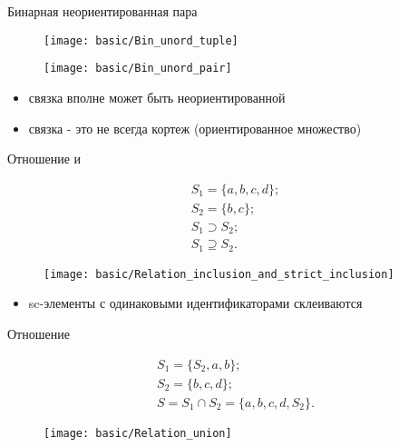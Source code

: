 \begin{frame}{Бинарная неориентированная пара}
  \begin{center}
    \begin{figure}
      \texttt{[image: basic/Bin\_unord\_tuple]}
    \end{figure}

    \objeqv

    \begin{figure}
      \texttt{[image: basic/Bin\_unord\_pair]}
    \end{figure}
  \end{center}

  \begin{itemize}
  \item связка вполне может быть неориентированной
  \item связка - это не всегда кортеж (ориентированное множество)
  \end{itemize}
\end{frame}

\begin{frame}[shrink=10]{Отношение  и }
  \begin{center}
    \begin{eqnarray*}
      S_1 = \{ a, b, c, d \}; \\
      S_2 = \{ b, c \}; \\
      S_1 \supset S_2; \\
      S_1 \supseteq S_2.
    \end{eqnarray*}

    \objeqv

    \begin{figure}
      \texttt{[image: basic/Relation\_inclusion\_and\_strict\_inclusion]}
    \end{figure}
  \end{center}

  \begin{itemize}
  \item sc-элементы с одинаковыми идентификаторами склеиваются
  \end{itemize}
\end{frame}

\begin{frame}[shrink=10]{Отношение }
  \begin{center}
    \begin{eqnarray*}
      S_1 = \{ S_2, a, b \}; \\
      S_2 = \{ b, c, d \}; \\
      S = S_1 \cap S_2 = \{ a, b, c, d, S_2 \}.
    \end{eqnarray*}

    \objeqv

    \begin{figure}
      \texttt{[image: basic/Relation\_union]}
    \end{figure}
  \end{center}
\end{frame}

